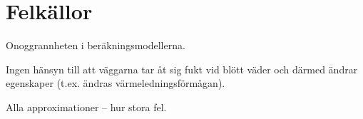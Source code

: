 \section{Felkällor}

Onoggrannheten i beräkningsmodellerna.

Ingen hänsyn till att väggarna tar åt sig fukt vid blött väder och därmed ändrar egenskaper (t.ex. ändras värmeledningsförmågan). 

Alla approximationer – hur stora fel.

